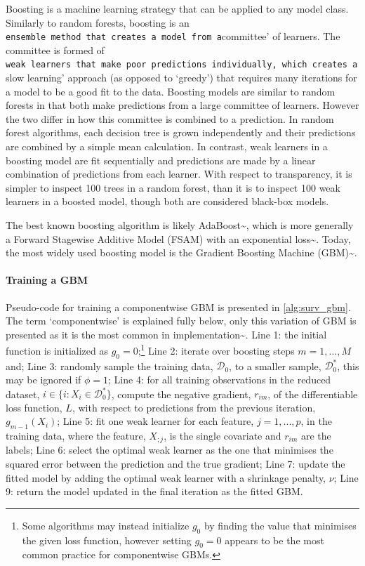 \documentclass[
  letterpaper,
]{scrbook}
\let\oldparagraph\paragraph
\renewcommand{\paragraph}[1]{\oldparagraph{#1}\mbox{}}
\theoremstyle{plain}
\theoremstyle{definition}
\theoremstyle{remark}
\begin{document}
Boosting is a machine learning strategy that can be applied to any model
class. Similarly to random forests, boosting is an
\texttt{ensemble\textquotesingle{}\ method\ that\ creates\ a\ model\ from\ a}committee'
of learners. The committee is formed of
\texttt{weak\textquotesingle{}\ learners\ that\ make\ poor\ predictions\ individually,\ which\ creates\ a}slow
learning' approach (as opposed to `greedy') that requires many
iterations for a model to be a good fit to the data. Boosting models are
similar to random forests in that both make predictions from a large
committee of learners. However the two differ in how this committee is
combined to a prediction. In random forest algorithms, each decision
tree is grown independently and their predictions are combined by a
simple mean calculation. In contrast, weak learners in a boosting model
are fit sequentially and predictions are made by a linear combination of
predictions from each learner. With respect to transparency, it is
simpler to inspect 100 trees in a random forest, than it is to inspect
100 weak learners in a boosted model, though both are considered
black-box models.

The best known boosting algorithm is likely
AdaBoost\textasciitilde{}\cite{Freund1996}, which is more generally a
Forward Stagewise Additive Model (FSAM) with an exponential
loss\textasciitilde{}\cite{Hastie2001}. Today, the most widely used
boosting model is the Gradient Boosting Machine
(GBM)\textasciitilde{}\cite{Friedman2001}.

\paragraph{Training a GBM}

Pseudo-code for training a componentwise GBM is presented in
\ref{alg:surv_gbm}. The term `componentwise' is explained fully below,
only this variation of GBM is presented as it is the most common in
implementation\textasciitilde{}\cite{pkggbm, pkgmboost}. Line 1: the
initial function is initialized as
\(g_0 = 0\);\footnote{Some algorithms may instead initialize $g_0$ by finding the value that minimises the given loss function, however setting $g_0 = 0$ appears to be the most common practice for componentwise GBMs.}
Line 2: iterate over boosting steps \(m = 1,...,M\) and; Line 3:
randomly sample the training data, \(\mathcal{D}_0\), to a smaller
sample, \(\mathcal{D}_0^*\), this may be ignored if \(\phi = 1\); Line
4: for all training observations in the reduced dataset,
\(i \in \{i:X_i \in \mathcal{D}_0^*\}\), compute the negative gradient,
\(r_{im}\), of the differentiable loss function, \(L\), with respect to
predictions from the previous iteration, \(g_{m-1}(X_i)\); Line 5: fit
one weak learner for each feature, \(j = 1,...,p\), in the training
data, where the feature, \(X_{;j}\), is the single covariate and
\(r_{im}\) are the labels; Line 6: select the optimal weak learner as
the one that minimises the squared error between the prediction and the
true gradient; Line 7: update the fitted model by adding the optimal
weak learner with a shrinkage penalty, \(\nu\); Line 9: return the model
updated in the final iteration as the fitted GBM.
\end{document}
